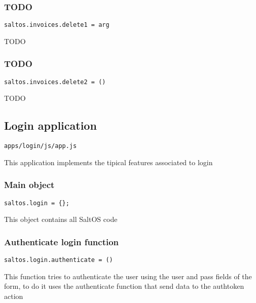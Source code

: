 \documentclass[a4paper]{article}
\begin{document}
\hypertarget{toc87}{}
\subsubsection{TODO}

\begin{lstlisting}
saltos.invoices.delete1 = arg
\end{lstlisting}

TODO

\hypertarget{toc88}{}
\subsubsection{TODO}

\begin{lstlisting}
saltos.invoices.delete2 = ()
\end{lstlisting}

TODO

\hypertarget{toc89}{}
\subsection{Login application}

\begin{lstlisting}
apps/login/js/app.js
\end{lstlisting}

This application implements the tipical features associated to login

\hypertarget{toc90}{}
\subsubsection{Main object}

\begin{lstlisting}
saltos.login = {};
\end{lstlisting}

This object contains all SaltOS code

\hypertarget{toc91}{}
\subsubsection{Authenticate login function}

\begin{lstlisting}
saltos.login.authenticate = ()
\end{lstlisting}

This function tries to authenticate the user using the user and pass fields of the form, to do
it uses the authenticate function that send data to the authtoken action
\end{document}
